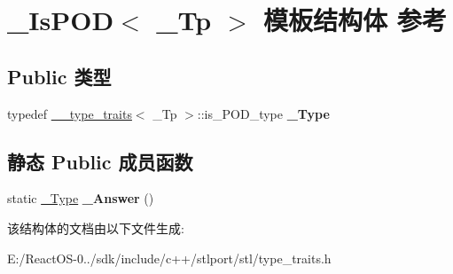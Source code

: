 \hypertarget{struct___is_p_o_d}{}\section{\+\_\+\+Is\+P\+OD$<$ \+\_\+\+Tp $>$ 模板结构体 参考}
\label{struct___is_p_o_d}
\subsection*{Public 类型}
\begin{DoxyCompactItemize}
\item 
\mbox{\label{struct___is_p_o_d_a40a3b3751414368f760861642a98ee63}} 
typedef \hyperlink{struct____type__traits}{\+\_\+\+\_\+type\+\_\+traits}$<$ \+\_\+\+Tp $>$\+::is\+\_\+\+P\+O\+D\+\_\+type {\bfseries \+\_\+\+Type}
\end{DoxyCompactItemize}
\subsection*{静态 Public 成员函数}
\begin{DoxyCompactItemize}
\item 
\mbox{\label{struct___is_p_o_d_ac8a52783be9f6b54e9c052c1621c88d7}} 
static \hyperlink{struct____true__type}{\+\_\+\+Type} {\bfseries \+\_\+\+Answer} ()
\end{DoxyCompactItemize}


该结构体的文档由以下文件生成\+:\begin{DoxyCompactItemize}
\item 
E\+:/\+React\+O\+S-\/0../sdk/include/c++/stlport/stl/type\+\_\+traits.\+h\end{DoxyCompactItemize}
